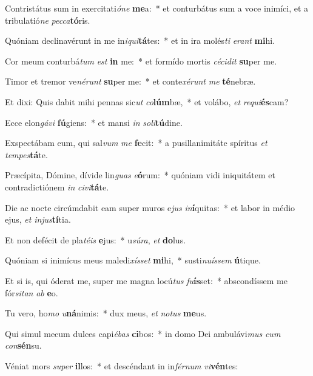 \item Contristátus sum in exercitati\textit{ó}\textit{ne} \textbf{me}a:~* et conturbátus sum a voce inimíci, et a tribulatió\textit{ne} \textit{pec}\textit{ca}\textbf{tó}ris.
\item Quóniam declinavérunt in me in\textit{i}\textit{qui}\textbf{tá}tes:~* et in ira molés\textit{ti} \textit{e}\textit{rant} \textbf{mi}hi.
\item Cor meum conturbá\textit{tum} \textit{est} \textbf{in} me:~* et formído mortis \textit{cé}\textit{ci}\textit{dit} \textbf{su}per me.
\item Timor et tremor ve\textit{né}\textit{runt} \textbf{su}per me:~* et conte\textit{xé}\textit{runt} \textit{me} \textbf{té}nebræ.
\item Et dixi: Quis dabit mihi pennas sic\textit{ut} \textit{co}\textbf{lúm}bæ,~* et volábo, \textit{et} \textit{re}\textit{qui}\textbf{és}cam?
\item Ecce elon\textit{gá}\textit{vi} \textbf{fú}giens:~* et mansi \textit{in} \textit{so}\textit{li}\textbf{tú}dine.
\item Exspectábam eum, qui sal\textit{vum} \textit{me} \textbf{fe}cit:~* a pusillanimitáte spíritus \textit{et} \textit{tem}\textit{pes}\textbf{tá}te.
\item Præcípita, Dómine, dívide lin\textit{guas} \textit{e}\textbf{ó}rum:~* quóniam vidi iniquitátem et contradictiónem \textit{in} \textit{ci}\textit{vi}\textbf{tá}te.
\item Die ac nocte circúmdabit eam super muros e\textit{jus} \textit{in}\textbf{í}quitas:~* et labor in médio ejus, \textit{et} \textit{in}\textit{jus}\textbf{tí}tia.
\item Et non defécit de pla\textit{té}\textit{is} \textbf{e}jus:~* u\textit{sú}\textit{ra}, \textit{et} \textbf{do}lus.
\item Quóniam si inimícus meus maledi\textit{xís}\textit{set} \textbf{mi}hi,~* susti\textit{nu}\textit{ís}\textit{sem} \textbf{ú}tique.
\item Et si is, qui óderat me, super me magna locú\textit{tus} \textit{fu}\textbf{ís}set:~* abscondíssem me fór\textit{si}\textit{tan} \textit{ab} \textbf{e}o.
\item Tu vero, ho\textit{mo} \textit{u}\textbf{ná}nimis:~* dux meus, \textit{et} \textit{no}\textit{tus} \textbf{me}us.
\item Qui simul mecum dulces capi\textit{é}\textit{bas} \textbf{ci}bos:~* in domo Dei ambulávi\textit{mus} \textit{cum} \textit{con}\textbf{sén}su.
\item Véniat mors \textit{su}\textit{per} \textbf{il}los:~* et descéndant in in\textit{fér}\textit{num} \textit{vi}\textbf{vén}tes:
